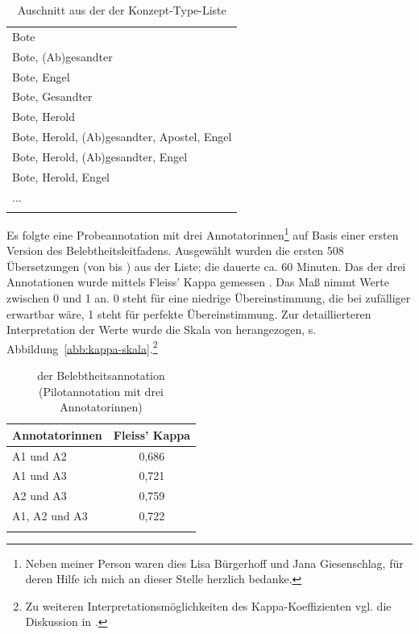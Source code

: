 \begin{table}
\centering
\begin{tabular}{l}
\lsptoprule
\multicolumn{1}{c}{Übersetzung (Konzept-Type)}    \\ \midrule
Bote                                        \\
Bote, (Ab)gesandter                         \\
Bote, Engel                                 \\
Bote, Gesandter                             \\
Bote, Herold                                \\
Bote, Herold, (Ab)gesandter, Apostel, Engel \\
Bote, Herold, (Ab)gesandter, Engel          \\
Bote, Herold, Engel                         \\
...                                         \\ \lspbottomrule
\end{tabular}
\caption{Auschnitt aus der der Konzept-Type-Liste\label{tab:konzept-types}}
\end{table}

Es folgte eine Probeannotation  mit drei Annotatorinnen\footnote{Neben meiner Person waren dies Lisa Bürgerhoff und Jana Giesenschlag, für deren Hilfe ich mich an dieser Stelle herzlich bedanke.} auf Basis einer ersten Version des Belebtheitsleitfadens. Ausgewählt wurden die ersten 508 Übersetzungen (von  bis ) aus der Liste; die  dauerte ca. 60 Minuten. Das  der drei Annotationen wurde mittels Fleiss' Kappa gemessen \parencite{Fleiss1971}. Das Maß nimmt Werte zwischen 0 und 1 an. 
0 steht für eine niedrige Übereinstimmung, die bei zufälliger  erwartbar wäre, 1 steht für perfekte Übereinstimmung. Zur detaillierteren Interpretation der Werte wurde die Skala von \textcite{Landis1977} herangezogen, s. Abbildung~\ref{abb:kappa-skala}.\footnote{Zu weiteren Interpretationsmöglichkeiten des Kappa-Koeffizienten vgl. die Diskussion in \textcite[576--577]{Artstein2008}.}

\begin{table}
\centering
\label{tab:iaa-pilot}
\begin{tabular}{lc}
\lsptoprule
Annotatorinnen & Fleiss' Kappa  \\ \midrule
A1 und A2               & 0,686  \\
A1 und A3               & 0,721  \\
A2 und A3               & 0,759  \\
A1, A2 und A3           & 0,722  \\ \lspbottomrule
\end{tabular}
\caption{ der Belebtheitsannotation (Pilotannotation mit drei Annotatorinnen)}
\end{table}

